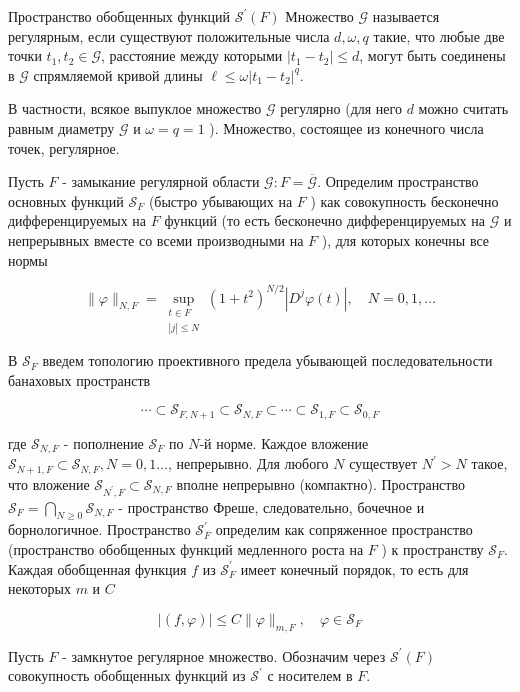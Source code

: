 Пространство обобщенных функций $\mathcal{S}^{\prime}(F)$ Множество $\mathcal{G}$ называется регулярным, если существуют положительные числа $d, \omega, q$ такие, что любые две точки $t_1, t_2 \in \mathcal{G}$, расстояние между которыми $\left|t_1-t_2\right| \leqslant d$, могут быть соединены в $\mathcal{G}$ спрямляемой кривой длины $\ell \leqslant \omega\left|t_1-t_2\right|^q$.

В частности, всякое выпуклое множество $\mathcal{G}$ регулярно (для него $d$ можно считать равным диаметру $\mathcal{G}$ и $\omega=q=1$ ). Множество, состоящее из конечного числа точек, регулярное.

Пусть $F$ - замыкание регулярной области $\mathcal{G}: F=\overline{\mathcal{G}}$. Определим пространство основных функций $\mathcal{S}_F$ (быстро убывающих на $F$ ) как совокупность бесконечно дифференцируемых на $F$ функций (то есть бесконечно дифференцируемых на $\mathcal{G}$ и непрерывных вместе со всеми производными на $F$ ), для которых конечны все нормы

$$
\|\varphi\|_{N, F}=\sup _{\substack{t \in F \\|j| \leqslant N}}\left(1+t^2\right)^{N / 2}\left|D^j \varphi(t)\right|, \quad N=0,1, \ldots
$$

В $\mathcal{S}_F$ введем топологию проективного предела убывающей последовательности банаховых пространств

$$
\cdots \subset \mathcal{S}_{F, N+1} \subset \mathcal{S}_{N, F} \subset \cdots \subset \mathcal{S}_{1, F} \subset \mathcal{S}_{0, F}
$$


где $\mathcal{S}_{N, F}$ - пополнение $\mathcal{S}_F$ по $N$-й норме. Каждое вложение $\mathcal{S}_{N+1, F} \subset \mathcal{S}_{N, F}, N=0,1 \ldots$, непрерывно. Для любого $N$ существует $N^{\prime}>N$ такое, что вложение $\mathcal{S}_{N^{\prime}, F} \subset \mathcal{S}_{N, F}$ вполне непрерывно (компактно). Пространство $\mathcal{S}_F=\bigcap_{N \geqslant 0} \mathcal{S}_{N, F}$ - пространство Фреше, следовательно, бочечное и борнологичное. Пространство $\mathcal{S}_F^{\prime}$ определим как сопряженное пространство (пространство обобщенных функций медленного роста на $F$ ) к пространству $\mathcal{S}_F$. Каждая обобщенная функция $f$ из $\mathcal{S}_F^{\prime}$ имеет конечный порядок, то есть для некоторых $m$ и $C$

$$
|(f, \varphi)| \leqslant C\|\varphi\|_{m, F}, \quad \varphi \in \mathcal{S}_F
$$

Пусть $F$ - замкнутое регулярное множество. Обозначим через $\mathcal{S}^{\prime}(F)$ совокупность обобщенных функций из $\mathcal{S}^{\prime}$ с носителем в $F$.

